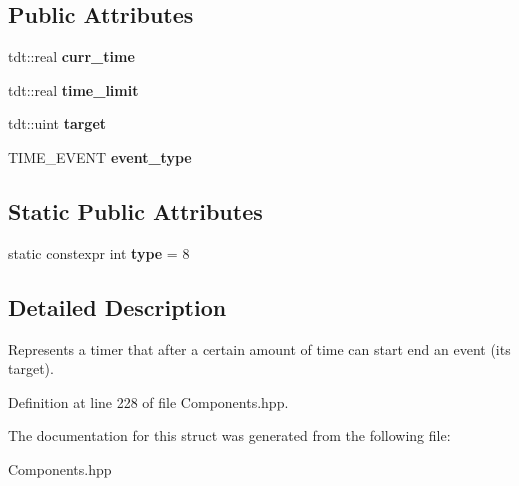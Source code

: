 \subsection*{Public Attributes}
\begin{DoxyCompactItemize}
\item 
tdt\+::real {\bfseries curr\+\_\+time}\hypertarget{struct_time_component_ade26adbb3e6c492af8f87581c66b1ffd}{}\label{struct_time_component_ade26adbb3e6c492af8f87581c66b1ffd}

\item 
tdt\+::real {\bfseries time\+\_\+limit}\hypertarget{struct_time_component_ad6fdadf78cfc6f3e04d1defe2de15307}{}\label{struct_time_component_ad6fdadf78cfc6f3e04d1defe2de15307}

\item 
tdt\+::uint {\bfseries target}\hypertarget{struct_time_component_a08f6395b6077056df668d570e4e4a221}{}\label{struct_time_component_a08f6395b6077056df668d570e4e4a221}

\item 
T\+I\+M\+E\+\_\+\+E\+V\+E\+NT {\bfseries event\+\_\+type}\hypertarget{struct_time_component_ab887881c59b6d5c7c4d3d62805a85bc4}{}\label{struct_time_component_ab887881c59b6d5c7c4d3d62805a85bc4}

\end{DoxyCompactItemize}
\subsection*{Static Public Attributes}
\begin{DoxyCompactItemize}
\item 
static constexpr int {\bfseries type} = 8\hypertarget{struct_time_component_ad1f645084a79f00d51ef100887293a38}{}\label{struct_time_component_ad1f645084a79f00d51ef100887293a38}

\end{DoxyCompactItemize}


\subsection{Detailed Description}
Represents a timer that after a certain amount of time can start end an event (it\textquotesingle{}s target). 

Definition at line 228 of file Components.\+hpp.



The documentation for this struct was generated from the following file\+:\begin{DoxyCompactItemize}
\item 
Components.\+hpp\end{DoxyCompactItemize}
